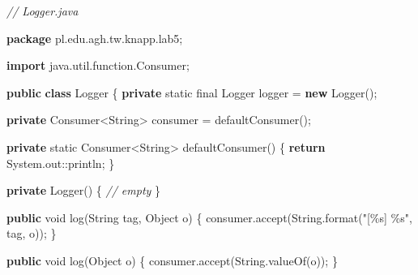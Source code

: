 \documentclass[11pt]{article}
\newenvironment{Shaded}{}{}
\newcommand{\KeywordTok}[1]{\textcolor[rgb]{0.00,0.44,0.13}{\textbf{{#1}}}}
\newcommand{\DataTypeTok}[1]{\textcolor[rgb]{0.56,0.13,0.00}{{#1}}}
\newcommand{\StringTok}[1]{\textcolor[rgb]{0.25,0.44,0.63}{{#1}}}
\newcommand{\CommentTok}[1]{\textcolor[rgb]{0.38,0.63,0.69}{\textit{{#1}}}}
\newcommand{\FunctionTok}[1]{\textcolor[rgb]{0.02,0.16,0.49}{{#1}}}
\newcommand{\NormalTok}[1]{{#1}}
\newcommand{\SpecialCharTok}[1]{\textcolor[rgb]{0.25,0.44,0.63}{{#1}}}
\newcommand{\ImportTok}[1]{{#1}}
\newcommand{\ControlFlowTok}[1]{\textcolor[rgb]{0.00,0.44,0.13}{\textbf{{#1}}}}
\newcommand{\OperatorTok}[1]{\textcolor[rgb]{0.40,0.40,0.40}{{#1}}}
\newcommand{\BuiltInTok}[1]{{#1}}
\begin{document}
\begin{Shaded}
\begin{Highlighting}[]
\CommentTok{// Logger.java}

\KeywordTok{package}\ImportTok{ pl}\OperatorTok{.}\ImportTok{edu}\OperatorTok{.}\ImportTok{agh}\OperatorTok{.}\ImportTok{tw}\OperatorTok{.}\ImportTok{knapp}\OperatorTok{.}\ImportTok{lab5}\OperatorTok{;}

\KeywordTok{import} \ImportTok{java}\OperatorTok{.}\ImportTok{util}\OperatorTok{.}\ImportTok{function}\OperatorTok{.}\ImportTok{Consumer}\OperatorTok{;}

\KeywordTok{public} \KeywordTok{class} \BuiltInTok{Logger} \OperatorTok{\{}
    \KeywordTok{private} \DataTypeTok{static} \DataTypeTok{final} \BuiltInTok{Logger}\NormalTok{ logger }\OperatorTok{=} \KeywordTok{new} \BuiltInTok{Logger}\OperatorTok{();}

    \KeywordTok{private}\NormalTok{ Consumer}\OperatorTok{\textless{}}\BuiltInTok{String}\OperatorTok{\textgreater{}}\NormalTok{ consumer }\OperatorTok{=} \FunctionTok{defaultConsumer}\OperatorTok{();}

    \KeywordTok{private} \DataTypeTok{static}\NormalTok{ Consumer}\OperatorTok{\textless{}}\BuiltInTok{String}\OperatorTok{\textgreater{}} \FunctionTok{defaultConsumer}\OperatorTok{()} \OperatorTok{\{}
        \ControlFlowTok{return} \BuiltInTok{System}\OperatorTok{.}\FunctionTok{out}\OperatorTok{::}\NormalTok{println}\OperatorTok{;}
    \OperatorTok{\}}

    \KeywordTok{private} \BuiltInTok{Logger}\OperatorTok{()} \OperatorTok{\{}
        \CommentTok{// empty}
    \OperatorTok{\}}

    \KeywordTok{public} \DataTypeTok{void} \FunctionTok{log}\OperatorTok{(}\BuiltInTok{String}\NormalTok{ tag}\OperatorTok{,} \BuiltInTok{Object}\NormalTok{ o}\OperatorTok{)} \OperatorTok{\{}
\NormalTok{        consumer}\OperatorTok{.}\FunctionTok{accept}\OperatorTok{(}\BuiltInTok{String}\OperatorTok{.}\FunctionTok{format}\OperatorTok{(}\StringTok{"[}\SpecialCharTok{\%s}\StringTok{] }\SpecialCharTok{\%s}\StringTok{"}\OperatorTok{,}\NormalTok{ tag}\OperatorTok{,}\NormalTok{ o}\OperatorTok{));}
    \OperatorTok{\}}

    \KeywordTok{public} \DataTypeTok{void} \FunctionTok{log}\OperatorTok{(}\BuiltInTok{Object}\NormalTok{ o}\OperatorTok{)} \OperatorTok{\{}
\NormalTok{        consumer}\OperatorTok{.}\FunctionTok{accept}\OperatorTok{(}\BuiltInTok{String}\OperatorTok{.}\FunctionTok{valueOf}\OperatorTok{(}\NormalTok{o}\OperatorTok{));}
    \OperatorTok{\}}


\end{Highlighting}
\end{Shaded}
\end{document}
